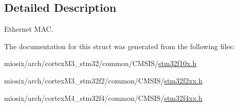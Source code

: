 \subsection{Detailed Description}
Ethernet M\-A\-C. 

The documentation for this struct was generated from the following files\-:\begin{DoxyCompactItemize}
\item 
miosix/arch/cortex\-M3\-\_\-stm32/common/\-C\-M\-S\-I\-S/\hyperlink{stm32f10x_8h}{stm32f10x.\-h}\item 
miosix/arch/cortex\-M3\-\_\-stm32f2/common/\-C\-M\-S\-I\-S/\hyperlink{stm32f2xx_8h}{stm32f2xx.\-h}\item 
miosix/arch/cortex\-M4\-\_\-stm32f4/common/\-C\-M\-S\-I\-S/\hyperlink{stm32f4xx_8h}{stm32f4xx.\-h}\end{DoxyCompactItemize}
